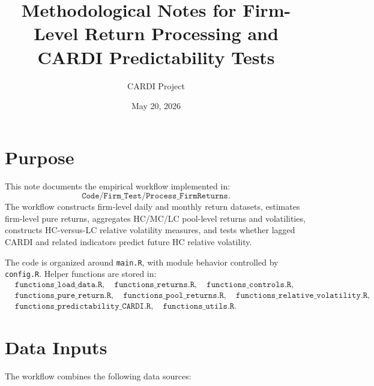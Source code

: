\documentclass[11pt]{article}
\title{Methodological Notes for Firm-Level Return Processing and CARDI Predictability Tests}
\author{CARDI Project}
\date{May 20, 2026}
\begin{document}
\maketitle

\section{Purpose}

This note documents the empirical workflow implemented in:
\[
\texttt{Code/Firm\_Test/Process\_FirmReturns}.
\]
The workflow constructs firm-level daily and monthly return datasets, estimates
firm-level pure returns, aggregates HC/MC/LC pool-level returns and volatilities,
constructs HC-versus-LC relative volatility measures, and tests whether lagged
CARDI and related indicators predict future HC relative volatility.

The code is organized around \texttt{main.R}, with module behavior controlled by
\texttt{config.R}. Helper functions are stored in:
\[
\begin{aligned}
&\texttt{functions\_load\_data.R},\quad
\texttt{functions\_returns.R},\quad
\texttt{functions\_controls.R},\\
&\texttt{functions\_pure\_return.R},\quad
\texttt{functions\_pool\_returns.R},\quad
\texttt{functions\_relative\_volatility.R},\\
&\texttt{functions\_predictability\_CARDI.R},\quad
\texttt{functions\_utils.R}.
\end{aligned}
\]

\section{Data Inputs}

The workflow combines the following data sources:
\end{document}
